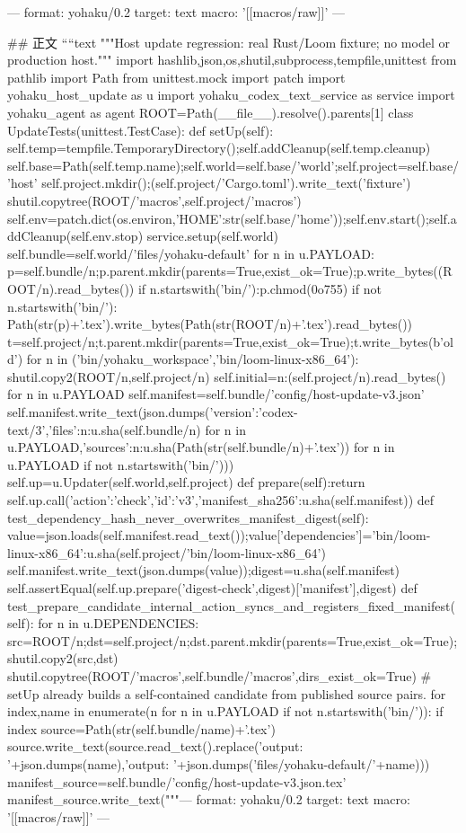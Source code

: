 ---
format: yohaku/0.2
target: text
macro: '[[macros/raw]]'
---

## 正文
````text
"""Host update regression: real Rust/Loom fixture; no model or production host."""
import hashlib,json,os,shutil,subprocess,tempfile,unittest
from pathlib import Path
from unittest.mock import patch
import yohaku_host_update as u
import yohaku_codex_text_service as service
import yohaku_agent as agent
ROOT=Path(__file__).resolve().parents[1]
class UpdateTests(unittest.TestCase):
 def setUp(self):
  self.temp=tempfile.TemporaryDirectory();self.addCleanup(self.temp.cleanup)
  self.base=Path(self.temp.name);self.world=self.base/'world';self.project=self.base/'host'
  self.project.mkdir();(self.project/'Cargo.toml').write_text('fixture')
  shutil.copytree(ROOT/'macros',self.project/'macros')
  self.env=patch.dict(os.environ,{'HOME':str(self.base/'home')});self.env.start();self.addCleanup(self.env.stop)
  service.setup(self.world)
  self.bundle=self.world/'files/yohaku-default'
  for n in u.PAYLOAD:
   p=self.bundle/n;p.parent.mkdir(parents=True,exist_ok=True);p.write_bytes((ROOT/n).read_bytes())
   if n.startswith('bin/'):p.chmod(0o755)
   if not n.startswith('bin/'):
    Path(str(p)+'.tex').write_bytes(Path(str(ROOT/n)+'.tex').read_bytes())
   t=self.project/n;t.parent.mkdir(parents=True,exist_ok=True);t.write_bytes(b'old')
  for n in ('bin/yohaku_workspace','bin/loom-linux-x86_64'):
   shutil.copy2(ROOT/n,self.project/n)
  self.initial={n:(self.project/n).read_bytes() for n in u.PAYLOAD}
  self.manifest=self.bundle/'config/host-update-v3.json'
  self.manifest.write_text(json.dumps({'version':'codex-text/3','files':{n:u.sha(self.bundle/n) for n in u.PAYLOAD},'sources':{n:u.sha(Path(str(self.bundle/n)+'.tex')) for n in u.PAYLOAD if not n.startswith('bin/')}}))
  self.up=u.Updater(self.world,self.project)
 def prepare(self):return self.up.call({'action':'check','id':'v3','manifest_sha256':u.sha(self.manifest)})
 def test_dependency_hash_never_overwrites_manifest_digest(self):
  value=json.loads(self.manifest.read_text());value['dependencies']={'bin/loom-linux-x86_64':u.sha(self.project/'bin/loom-linux-x86_64')}
  self.manifest.write_text(json.dumps(value));digest=u.sha(self.manifest)
  self.assertEqual(self.up.prepare('digest-check',digest)['manifest'],digest)
 def test_prepare_candidate_internal_action_syncs_and_registers_fixed_manifest(self):
  for n in u.DEPENDENCIES:
   src=ROOT/n;dst=self.project/n;dst.parent.mkdir(parents=True,exist_ok=True);shutil.copy2(src,dst)
  shutil.copytree(ROOT/'macros',self.bundle/'macros',dirs_exist_ok=True)
  # setUp already builds a self-contained candidate from published source pairs.
  for index,name in enumerate(n for n in u.PAYLOAD if not n.startswith('bin/')):
   if index %
    source=Path(str(self.bundle/name)+'.tex')
    source.write_text(source.read_text().replace('output: '+json.dumps(name),'output: '+json.dumps('files/yohaku-default/'+name)))
  manifest_source=self.bundle/'config/host-update-v3.json.tex'
  manifest_source.write_text("""---
format: yohaku/0.2
target: text
macro: '[[macros/raw]]'
---

